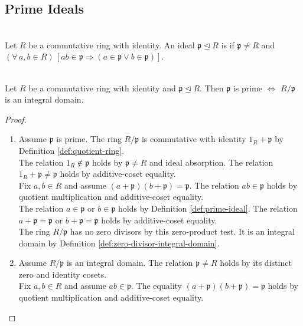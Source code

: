 \subsection{Prime Ideals}

\begin{definition} \label{def:prime-ideal} \\
Let $R$ be a commutative ring with identity. An ideal $\mathfrak{p}\trianglelefteq R$ is  if $\mathfrak{p}\neq R$ and $(\forall\,a,b\in R)\,[ab\in\mathfrak{p}\Rightarrow(a\in\mathfrak{p}\lor b\in\mathfrak{p})]$.
\end{definition}

\begin{theorem} \label{thm:prime-ideal-quotient-domain} \\
Let $R$ be a commutative ring with identity and $\mathfrak{p}\trianglelefteq R$. Then $\mathfrak{p}$ is prime $\iff$ $R/\mathfrak{p}$ is an integral domain.
\begin{proof}
\begin{enumerate}[label=\roman*.]
\setlength{\itemsep}{0pt}
\item[$(\Rightarrow)$] Assume $\mathfrak{p}$ is prime. The ring $R/\mathfrak{p}$ is commutative with identity $1_R+\mathfrak{p}$ by Definition \ref{def:quotient-ring}.\\
The relation $1_R\notin\mathfrak{p}$ holds by $\mathfrak{p}\neq R$ and ideal absorption. The relation $1_R+\mathfrak{p}\neq\mathfrak{p}$ holds by additive-coset equality.\\
Fix $a,b\in R$ and assume $(a+\mathfrak{p})(b+\mathfrak{p})=\mathfrak{p}$. The relation $ab\in\mathfrak{p}$ holds by quotient multiplication and additive-coset equality.\\
The relation $a\in\mathfrak{p}$ or $b\in\mathfrak{p}$ holds by Definition \ref{def:prime-ideal}. The relation $a+\mathfrak{p}=\mathfrak{p}$ or $b+\mathfrak{p}=\mathfrak{p}$ holds by additive-coset equality.\\
The ring $R/\mathfrak{p}$ has no zero divisors by this zero-product test. It is an integral domain by Definition \ref{def:zero-divisor-integral-domain}.
\item[$(\Leftarrow)$] Assume $R/\mathfrak{p}$ is an integral domain. The relation $\mathfrak{p}\neq R$ holds by its distinct zero and identity cosets.\\
Fix $a,b\in R$ and assume $ab\in\mathfrak{p}$. The equality $(a+\mathfrak{p})(b+\mathfrak{p})=\mathfrak{p}$ holds by quotient multiplication and additive-coset equality.\\

\end{enumerate}
\end{proof}
\end{theorem}
